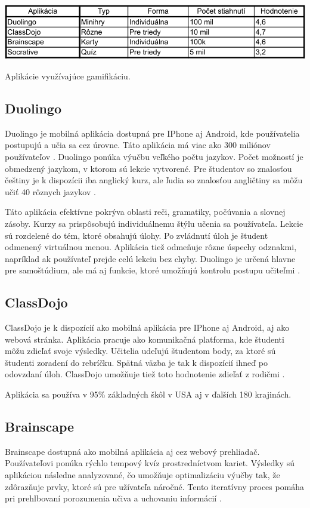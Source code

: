 \documentclass[10pt,twoside,slovak,a4paper]{article}
\begin{document}
\begin{table}[tbh]
\centering
\includegraphics[scale=1.0]{aplikacie.pdf}
\caption{Aplikácie využívajúce gamifikáciu.}
\label{f:aplikacie}
\end{table}


\subsection{Duolingo}

Duolingo je mobilná aplikácia dostupná pre IPhone aj Android, kde používatelia postupujú a učia sa cez úrovne. Táto aplikácia má viac ako 300 miliónov používateľov \cite{Frederic}. Duolingo ponúka výučbu veľkého počtu jazykov. Počet možností je obmedzený jazykom, v ktorom sú lekcie vytvorené. Pre študentov so znalosťou češtiny je k dispozícii iba anglický kurz, ale ľudia so znalosťou angličtiny sa môžu učiť 40 rôznych jazykov \cite{Duolingo}.

Táto aplikácia efektívne pokrýva oblasti reči, gramatiky, počúvania a slovnej zásoby. Kurzy sa prispôsobujú individuálnemu štýlu učenia sa používateľa. Lekcie sú rozdelené do tém, ktoré obsahujú úlohy. Po zvládnutí úloh je študent odmenený virtuálnou menou. Aplikácia tiež odmeňuje rôzne úspechy odznakmi, napríklad ak používateľ prejde celú lekciu bez chyby. Duolingo je určená hlavne pre samoštúdium, ale má aj funkcie, ktoré umožňujú kontrolu postupu učiteľmi \cite{Prathyusha}.

\subsection{ClassDojo}

ClassDojo je k dispozícií ako mobilná aplikácia pre IPhone aj Android, aj ako webová stránka. Aplikácia pracuje ako komunikačná platforma, kde študenti môžu zdieľať svoje výsledky. Učitelia udeľujú študentom body, za ktoré sú študenti zoradení do rebríčku. Spätná väzba je tak k dispozícií ihneď po odovzdaní úloh. ClassDojo umožňuje tiež toto hodnotenie zdieľať z rodičmi \cite{Prathyusha}.

Aplikácia sa používa v 95\% základných škôl v USA aj v ďalších 180 krajinách. \cite{Chaykowski}

\subsection{Brainscape}
Brainscape dostupná ako mobilná aplikácia aj cez webový prehliadač. Používateľovi ponúka rýchlo tempový kvíz prostredníctvom kariet. Výsledky sú aplikáciou následne analyzované, čo umožňuje optimalizáciu výučby tak, že zdôrazňuje prvky, ktoré sú pre užívateľa náročné. Tento iteratívny proces pomáha pri prehlbovaní porozumenia učiva a uchovaniu informácií \cite{Brainscape}.
\end{document}
